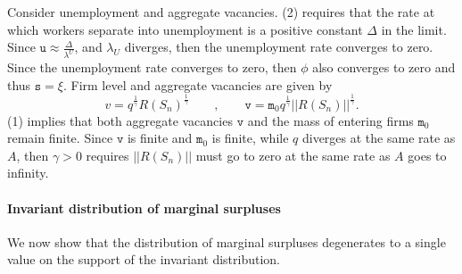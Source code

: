 Consider unemployment and aggregate vacancies.
(2) requires that the rate at which workers separate into unemployment is a positive constant $\Delta$ in the limit.
Since $\mathtt{u}\approx \frac{\Delta }{\lambda ^{U}}$, and $\lambda_U$ diverges, then the unemployment rate converges to zero.
Since the unemployment rate converges to zero, then $\phi$ also converges to zero and thus $\mathtt{s}= \xi$.
Firm level and aggregate vacancies are given by
\begin{equation}\label{eq:vappendix}
v = q^{\frac{1}{\gamma}}R\left(S_n\right)^{\frac{1}{\gamma}}
\quad\quad,\quad\quad \mathtt{v}=\mathtt{m}_{0}q^{\frac{1}{\gamma}}||R\left( S_{n}\right) ||^{\frac{1}{\gamma}}.
\end{equation}
(1) implies that both aggregate vacancies $\mathtt{v}$ and the mass of entering firms $\texttt{m}_0$ remain finite.
Since $\mathtt{v}$ is finite and $\mathtt{m}_0$ is finite, while $q$ diverges at the same rate as $A$, then $\gamma>0$ requires $||R\left( S_{n}\right) ||$ must go to zero at the same rate as $A$ goes to infinity.

\paragraph{Invariant distribution of marginal surpluses}

We now show that the distribution of marginal surpluses degenerates to a single value on the support of the invariant distribution.

